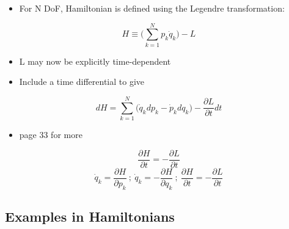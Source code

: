 \documentclass[a4paper,11pt,normalem]{article}
\begin{document}
\begin{itemize}
\item
  For N DoF, Hamiltonian is defined using the Legendre transformation:
\end{itemize}

\[
    H \equiv \Bigg(\sum_{k = 1}^{N} p_{k}\dot{q}_k \Bigg) - L
\]

\begin{itemize}
\item
  L may now be explicitly time-dependent
\item
  Include a time differential to give
\end{itemize}

\[
    dH = \sum_{k = 1}^{N} \Big(\dot{q}_k dp_k - \dot{p}_kdq_k\Big) - \frac{\partial L}{\partial t}dt
\]

\begin{itemize}
\item
  page 33 for more
\end{itemize}

\[
    \frac{\partial H}{\partial t} = -\frac{\partial L}{\partial t} \] \[
    \dot{q}_k = \frac{\partial H}{\partial p_k} ~;~ \dot{q}_k = -\frac{\partial H}{\partial q_k} ~;~ \frac{\partial H}{\partial t} = -\frac{\partial L}{\partial t}
\]

\subsection{Examples in Hamiltonians}\label{examples-in-hamiltonians}
\end{document}
